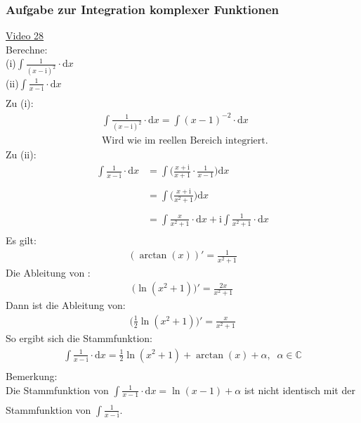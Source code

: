 \subsubsection{Aufgabe zur Integration komplexer Funktionen}
\href{https://youtu.be/jG6L4TwLSK0}{Video 28}\\
Berechne:\\
(i)\;\;\;$ \int\limits_{}^{} \frac{1}{(x-\mathrm{i})^2}\cdot \mathrm{d}x $\\
(ii)\;\;$ \int\limits_{}^{} \frac{1}{x-\mathrm{i}}\cdot \mathrm{d}x $\\
Zu (i):\\
\begin{align*}
&\int\limits_{}^{} \frac{1}{(x-\mathrm{i})^2}\cdot \mathrm{d}x=\int\limits_{}^{} (x-1)^{-2}\cdot\mathrm{d}x\\
&\text{Wird wie im reellen Bereich integriert. }
\end{align*}
Zu (ii):\\
\begin{align*}
\int\limits_{}^{} \frac{1}{x-\mathrm{i}}\cdot \mathrm{d}x&=\int\limits_{}^{} \bigg(\frac{x+\mathrm{i}}{x+1}\cdot \frac{1}{x-1}\bigg)\mathrm{d}x\\
&=\int\limits_{}^{}\bigg( \frac{x+\mathrm{i}}{x^2+1}\bigg)\mathrm{d}x\\
&=\int\limits_{}^{} \frac{x}{x^2+1}\cdot \mathrm{d}x+\mathrm{i}\int\limits_{}^{} \frac{1}{x^2+1}\cdot \mathrm{d}x
\end{align*}
Es gilt:\\
\begin{align*}
(\arctan(x))'=\frac{1}{x^2+1}
\end{align*}
Die Ableitung von :\\
\begin{align*}
\big(\ln(x^2+1)\big)'= \frac{2x}{x^2+1}
\end{align*}
Dann ist die Ableitung von:\\
\begin{align*}
\bigg(\frac{1}{2}\ln(x^2+1)\bigg)'=\frac{x}{x^2+1}
\end{align*}
So ergibt sich die Stammfunktion:\\
\begin{align*}
\int\limits_{}^{} \frac{1}{x-\mathrm{i}}\cdot \mathrm{d}x=\frac{1}{2}\ln(x^2+1)+\arctan(x)+\alpha,\;\;\alpha\in \mathbb{C}
\end{align*}
Bemerkung:\\
Die Stammfunktion von $ \int\limits_{}^{} \frac{1}{x-1} \cdot \mathrm{d}x=\ln(x-1)+\alpha$ ist nicht identisch mit der Stammfunktion von $ \int\limits_{}^{} \frac{1}{x-\mathrm{i}} $.\\

